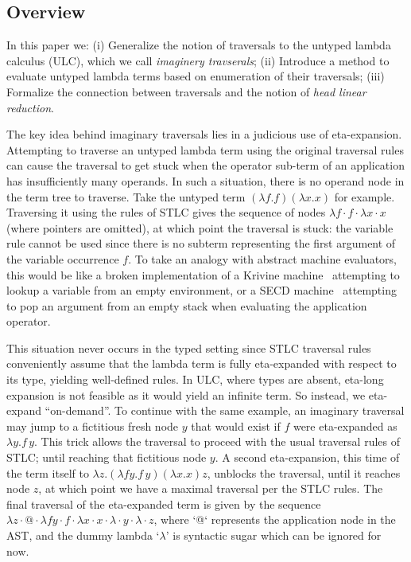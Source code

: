 \documentclass{elsarticle}
\theoremstyle{plain}
\theoremstyle{definition}
\theoremstyle{remark}
\begin{document}
\subsection{Overview}
In this paper we: (i) Generalize the notion of traversals to the untyped lambda calculus (ULC), which we call \emph{imaginery travserals}; (ii) Introduce a method to evaluate untyped lambda terms based on enumeration of their traversals; (iii) Formalize the connection between traversals and the notion of \emph{head linear reduction}.

The key idea behind imaginary traversals lies in a judicious use of eta-expansion. Attempting to traverse an untyped lambda term using the original traversal rules can cause the traversal to get stuck when the operator sub-term of an application has insufficiently many operands. In such a situation, there is no operand node in the term tree to traverse. Take the untyped term $(\lambda f.f)(\lambda x.x)$ for example. Traversing it using the rules of STLC gives the sequence of nodes $\lambda f \cdot f \cdot \lambda x \cdot x$ (where pointers are omitted), at which point the traversal is stuck: the variable rule cannot be used since there is no subterm representing the first argument of the variable occurrence $f$.
To take an analogy with abstract machine evaluators, this would be like a broken implementation of a Krivine machine~\cite{Krivine2007} attempting to lookup a variable from an empty environment, or a SECD machine~\cite{landin-secd} attempting to pop an argument from an empty stack when evaluating the application operator.

This situation never occurs in the typed setting since STLC traversal rules conveniently assume that the lambda term is fully eta-expanded with respect to its type, yielding well-defined rules. In ULC, where types are absent, eta-long expansion is not feasible as it would yield an infinite term. So instead, we eta-expand ``on-demand''. To continue with the same example, an imaginary traversal may jump to a fictitious fresh node $y$ that would exist if $f$ were eta-expanded
as $\lambda y.f\, y$. This trick allows the traversal to proceed with the usual traversal rules of STLC; until reaching that fictitious node $y$.
A second eta-expansion, this time of the term itself to
$\lambda z. (\lambda f y.f\, y)(\lambda x.x) z$,
unblocks the traversal, until it reaches node $z$, at which point we have a maximal traversal per the STLC rules. The final traversal of the eta-expanded term is given by the sequence $\lambda z \cdot @ \cdot \lambda f y \cdot f \cdot \lambda x \cdot x \cdot \lambda \cdot y \cdot \lambda \cdot z$, where `@` represents the application node in the AST, and the dummy lambda `$\lambda$' is syntactic sugar which can be ignored for now.
\end{document}
